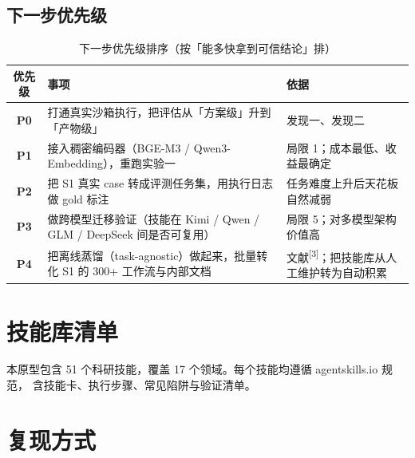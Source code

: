 \documentclass[UTF8, fontset=windows, 11pt, a4paper]{ctexart}
\begin{document}
\subsection{下一步优先级}

\begin{table}[h]
\centering
\small
\begin{tabularx}{\textwidth}{@{}>{\bfseries}c >{\raggedright\arraybackslash}X >{\raggedright\arraybackslash}p{2.6cm}@{}}
\toprule
优先级 & 事项 & 依据 \\
\midrule
P0 & 打通真实沙箱执行，把评估从「方案级」升到「产物级」 & 发现一、发现二 \\
P1 & 接入稠密编码器（BGE-M3 / Qwen3-Embedding），重跑实验一 & 局限 1；成本最低、收益最确定 \\
P2 & 把 S1 真实 case 转成评测任务集，用执行日志做 gold 标注 & 任务难度上升后天花板自然减弱 \\
P3 & 做跨模型迁移验证（技能在 Kimi / Qwen / GLM / DeepSeek 间是否可复用） & 局限 5；对多模型架构价值高 \\
P4 & 把离线蒸馏（task-agnostic）做起来，批量转化 S1 的 300+ 工作流与内部文档 & 文献\textsuperscript{[3]}；把技能库从人工维护转为自动积累 \\
\bottomrule
\end{tabularx}
\caption{下一步优先级排序（按「能多快拿到可信结论」排）}
\end{table}

\newpage

\appendix
\renewcommand{\thesection}{附录 \Alph{section}}

\section{技能库清单}

本原型包含 51 个科研技能，覆盖 17 个领域。每个技能均遵循 agentskills.io 规范，
含技能卡、执行步骤、常见陷阱与验证清单。

\vspace{0.6em}
{\small

}

\section{复现方式}
\end{document}
